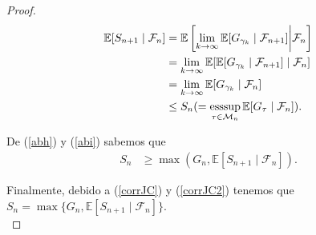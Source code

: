 \begin{proof}
	\begin{align}
	\mathbb{E}[S_{n+1} \mid \mathcal{F}_n] & = \mathbb{E}\left[\lim_{k \rightarrow \infty} \mathbb{E}[G_{\gamma_k} \mid \mathcal{F}_{n+1}] \bigg | \mathcal{F}_n \right]  \nonumber \\
	& = \lim_{k \rightarrow \infty} \mathbb{E}[\mathbb{E}[G_{\gamma_k} \mid \mathcal{F}_{n+1}] \mid \mathcal{F}_n] \nonumber \\
	& = \lim_{k \rightarrow \infty} \mathbb{E}[G_{\gamma_k} \mid \mathcal{F}_n] \nonumber \\
	& \leq S_n ( = \operatorname*{esssup}_{\tau \in \mathcal{M}_n} \mathbb{E}[G_\tau \mid \mathcal{F}_n]). \label{abi}
	\end{align}

De (\ref{abh}) y (\ref{abi}) sabemos que
\begin{align}
S_n & \geq \max (G_n, \mathbb{E}[S_{n+1} \mid \mathcal{F}_n]).
\end{align}

Finalmente, debido a (\ref{corrJC}) y (\ref{corrJC2}) tenemos que $S_n = \max \{G_n, \mathbb{E}[S_{n+1} \mid \mathcal{F}_n]\}$. \\


\end{proof}
